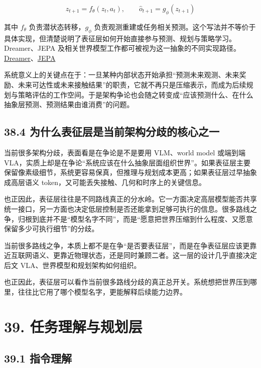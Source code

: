 \begingroup
\footnotesize
\begin{equation*}
z_{t+1} = f_\theta(z_t, a_t), \qquad \hat{o}_{t+1} = g_\phi(z_{t+1})
\end{equation*}
\endgroup

其中 \(f_\theta\) 负责潜状态转移，\(g_\phi\) 负责观测重建或任务相关预测。这个写法并不等价于具体实现，但清楚说明了表征层如何开始直接参与预测、规划与策略学习。Dreamer、JEPA 及相关世界模型工作都可被视为这一抽象的不同实现路径。\href{https://arxiv.org/abs/1912.01603}{Dreamer}、\href{https://arxiv.org/abs/2301.08243}{JEPA}

系统意义上的关键点在于：一旦某种内部状态开始承担“预测未来观测、未来奖励、未来可达性或未来接触结果”的职责，它就不再只是压缩表示，而成为后续规划与策略评估的工作空间。于是架构争论也会随之转变成“应该预测什么、在什么抽象层预测、预测结果由谁消费”的问题。

\subsection*{38.4 为什么表征层是当前架构分歧的核心之一}


当前很多架构分歧，表面看是在争论是不是要用 VLM、world model 或端到端 VLA，实质上却是在争论“系统应该在什么抽象层面组织世界”。如果表征层主要保留像素级细节，系统更容易保真，但推理与规划成本更高；如果表征层过早抽象成高层语义 token，又可能丢失接触、几何和时序上的关键信息。

也正因此，表征层往往是不同路线真正的分水岭。它一方面决定高层模型能否共享统一接口，另一方面也决定低层控制是否还能拿到足够可执行的信息。很多路线之争，归根到底并不是“模型名字不同”，而是“愿意把世界压缩到什么程度、又愿意保留多少可执行细节”的分歧。

当前很多路线之争，本质上都不是在争“是否要表征层”，而是在争表征层应该更靠近互联网语义、更靠近物理状态，还是同时兼顾二者。这一层的设计几乎直接决定后文 VLA、世界模型和规划架构如何组织。

也正因此，表征层可以看作当前很多路线分歧的真正总开关。系统想把世界压到哪里，往往比它用了哪个模型名字，更能解释后续能力边界。

\section*{39. 任务理解与规划层}

\subsection*{39.1 指令理解}


